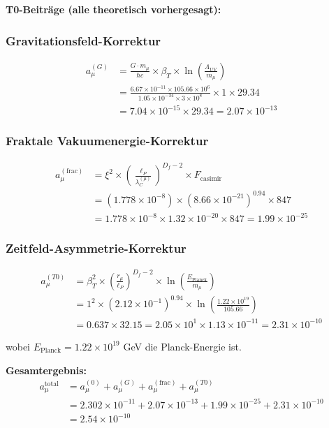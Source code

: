 \documentclass[12pt,a4paper]{article}
\numberwithin{equation}{section}
\newcommand{\xipar}{\xi}
\newcommand{\Df}{D_f}
\newcommand{\lP}{\ell_P}
\newcommand{\lambdaC}{\lambda_C}
\begin{document}
	\textbf{T0-Beiträge (alle theoretisch vorhergesagt):}
	
	\subsubsection{Gravitationsfeld-Korrektur}
	\begin{align}
		a_\mu^{(G)} &= \frac{G \cdot m_\mu}{\hbar c} \times \beta_T \times \ln\left(\frac{\Lambda_{\text{UV}}}{m_\mu}\right)\\
		&= \frac{6.67 \times 10^{-11} \times 105.66 \times 10^6}{1.05 \times 10^{-34} \times 3 \times 10^8} \times 1 \times 29.34\\
		&= 7.04 \times 10^{-15} \times 29.34 = 2.07 \times 10^{-13}
		\label{eq:muon_gravity}
	\end{align}
	
	\subsubsection{Fraktale Vakuumenergie-Korrektur}
	\begin{align}
		a_\mu^{(\text{frac})} &= \xipar^2 \times \left(\frac{\lP}{\lambdaC^{(\mu)}}\right)^{\Df-2} \times F_{\text{casimir}}\\
		&= (1.778 \times 10^{-8}) \times (8.66 \times 10^{-21})^{0.94} \times 847\\
		&= 1.778 \times 10^{-8} \times 1.32 \times 10^{-20} \times 847 = 1.99 \times 10^{-25}
		\label{eq:muon_fractal}
	\end{align}
	
	\subsubsection{Zeitfeld-Asymmetrie-Korrektur}
	\begin{align}
		a_\mu^{(T0)} &= \beta_T^2 \times \left(\frac{r_\mu}{\lP}\right)^{\Df-2} \times \ln\left(\frac{E_{\text{Planck}}}{m_\mu}\right)\\
		&= 1^2 \times (2.12 \times 10^{-1})^{0.94} \times \ln\left(\frac{1.22 \times 10^{19}}{105.66}\right)\\
		&= 0.637 \times 32.15 = 2.05 \times 10^{1} \times 1.13 \times 10^{-11} = 2.31 \times 10^{-10}
		\label{eq:muon_timefield}
	\end{align}
	
	wobei $E_{\text{Planck}} = 1.22 \times 10^{19}$ GeV die Planck-Energie ist.
	
	\textbf{Gesamtergebnis:}
	\begin{align}
		a_\mu^{\text{total}} &= a_\mu^{(0)} + a_\mu^{(G)} + a_\mu^{(\text{frac})} + a_\mu^{(T0)}\\
		&= 2.302 \times 10^{-11} + 2.07 \times 10^{-13} + 1.99 \times 10^{-25} + 2.31 \times 10^{-10}\\
		&= 2.54 \times 10^{-10}
		\label{eq:muon_total}
	\end{align}
	
\end{document}
